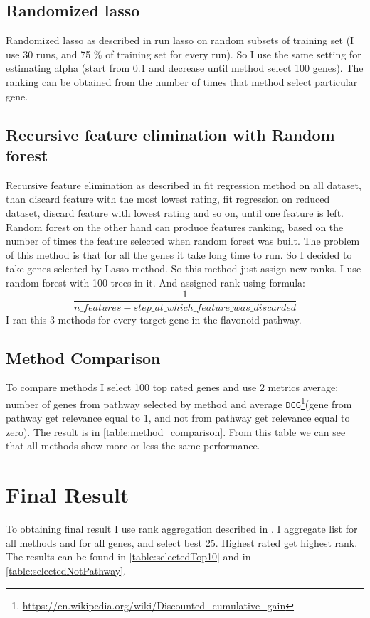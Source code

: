 \documentclass[conference]{IEEEtran}
\begin{document}
\subsection{Randomized lasso}
Randomized lasso as described in \cite{randomized_lasso} run lasso on random subsets of training set (I use 30 runs, and 75 \% of training set for every run). So I use the same setting for estimating alpha (start from 0.1 and decrease until method select 100 genes). The ranking can be obtained from the number of times that method select particular gene.
\subsection{Recursive feature elimination with Random forest}
Recursive feature elimination as described in \cite{rfe} fit regression method on all dataset, than discard feature with the most lowest rating, fit regression on reduced dataset, discard feature with lowest rating and so on, until one feature is left. Random forest on the other hand can produce features ranking, based on the number of times the feature selected when random forest was built. The problem of this method is that for all the genes it take long time to run. So I decided to take genes selected by Lasso method. So this method just assign new ranks. I use random forest with 100 trees in it. And assigned rank using formula:
\begin{equation*}
\frac{1}{n\_features - step\_at\_which\_feature\_was\_discarded}
\end{equation*}
I ran this 3 methods for every target gene in the flavonoid pathway.


\subsection{Method Comparison}
To compare methods I select 100 top rated genes and use 2 metrics average: number of genes from pathway selected by method and average \texttt{DCG}\footnote{\url{https://en.wikipedia.org/wiki/Discounted_cumulative_gain}}(gene from pathway get relevance equal to 1, and not from pathway get relevance equal to zero). The result is in \cref{table:method_comparison}. From this table we can see that all methods show more or less the same performance.


\section{Final Result}
To obtaining final result I use rank aggregation described in \cite{rang_aggr}. I aggregate list for all methods and for all genes, and select best 25. Highest rated get highest rank. The results can be found in \cref{table:selectedTop10} and in \cref{table:selectedNotPathway}.
\end{document}

